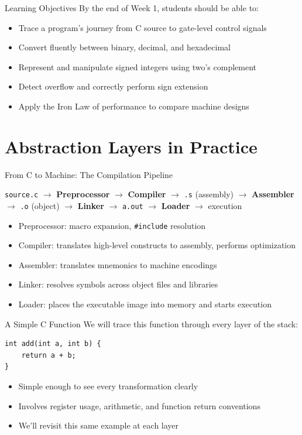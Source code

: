 \documentclass[10pt, aspectratio=169]{beamer}
\begin{document}
\begin{frame}{Learning Objectives}
By the end of Week 1, students should be able to:
\begin{itemize}
    \item Trace a program's journey from C source to gate-level control signals
    \item Convert fluently between binary, decimal, and hexadecimal
    \item Represent and manipulate signed integers using two's complement
    \item Detect overflow and correctly perform sign extension
    \item Apply the Iron Law of performance to compare machine designs
\end{itemize}
\end{frame}

\section{Abstraction Layers in Practice}

\begin{frame}{From C to Machine: The Compilation Pipeline}
\begin{center}
\texttt{source.c} $\rightarrow$ \textbf{Preprocessor} $\rightarrow$ \textbf{Compiler} $\rightarrow$
\texttt{.s} (assembly) $\rightarrow$ \textbf{Assembler} $\rightarrow$ \texttt{.o} (object) $\rightarrow$
\textbf{Linker} $\rightarrow$ \texttt{a.out} $\rightarrow$ \textbf{Loader} $\rightarrow$ execution
\end{center}
\vspace{0.3cm}
\begin{itemize}
    \item Preprocessor: macro expansion, \texttt{\#include} resolution
    \item Compiler: translates high-level constructs to assembly, performs optimization
    \item Assembler: translates mnemonics to machine encodings
    \item Linker: resolves symbols across object files and libraries
    \item Loader: places the executable image into memory and starts execution
\end{itemize}
\end{frame}

\begin{frame}[fragile]{A Simple C Function}
We will trace this function through every layer of the stack:
\begin{lstlisting}
int add(int a, int b) {
    return a + b;
}
\end{lstlisting}
\begin{itemize}
    \item Simple enough to see every transformation clearly
    \item Involves register usage, arithmetic, and function return conventions
    \item We'll revisit this same example at each layer
\end{itemize}
\end{frame}
\end{document}
